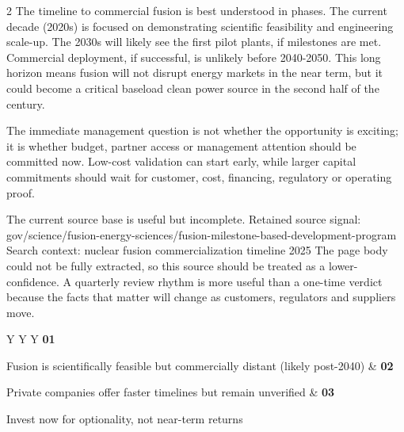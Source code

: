 \documentclass[10pt,a4paper]{article}
\begin{document}
\begin{multicols}{2}
{\small The timeline to commercial fusion is best understood in phases. The current decade (2020s) is focused on demonstrating scientific feasibility and engineering scale-up. The 2030s will likely see the first pilot plants, if milestones are met. Commercial deployment, if successful, is unlikely before 2040-2050. This long horizon means fusion will not disrupt energy markets in the near term, but it could become a critical baseload clean power source in the second half of the century.}\par
{\small The immediate management question is not whether the opportunity is exciting; it is whether budget, partner access or management attention should be committed now. Low-cost validation can start early, while larger capital commitments should wait for customer, cost, financing, regulatory or operating proof.}\par
{\small The current source base is useful but incomplete. Retained source signal: gov/science/fusion-energy-sciences/fusion-milestone-based-development-program Search context: nuclear fusion commercialization timeline 2025 The page body could not be fully extracted, so this source should be treated as a lower-confidence. A quarterly review rhythm is more useful than a one-time verdict because the facts that matter will change as customers, regulators and suppliers move.}\par
\end{multicols}
\vspace{5pt}\noindent\begin{tabularx}{\linewidth}{Y Y Y}
{\textcolor{BOGreen}{\bfseries 01}}\par{\scriptsize\color{BOText} Fusion is scientifically feasible but commercially distant (likely post-2040)} & {\textcolor{BOGreen}{\bfseries 02}}\par{\scriptsize\color{BOText} Private companies offer faster timelines but remain unverified} & {\textcolor{BOGreen}{\bfseries 03}}\par{\scriptsize\color{BOText} Invest now for optionality, not near-term returns} \\
\end{tabularx}\par\vspace{2pt}
\label{chap:1:end}
\end{document}
